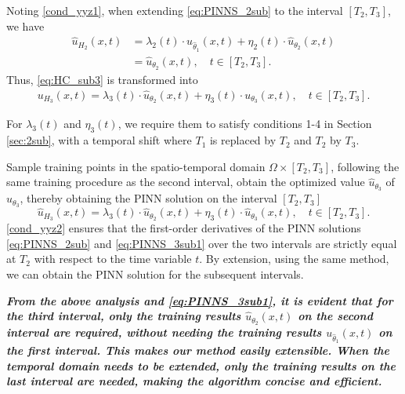 \documentclass[preprint]{elsarticle}
\numberwithin{table}{section}
\numberwithin{equation}{section}
\numberwithin{figure}{section}
\begin{document}
\begin{CJK}{UTF8}{gbsn}
 Noting \eqref{cond_yyz1}, when extending \eqref{eq:PINNS_2sub} to the interval $[T_2,T_3]$, we have 
\begin{equation}\label{eq:HC_T2}
\begin{aligned}
     \hat{u}_{H_2}(x,t) &= \lambda_2(t)\cdot u_{\hat\theta_1}(x,t) + \eta_2(t)\cdot \hat{u}_{\theta_2}(x,t)\\
     &= \hat{u}_{\theta_2}(x,t), \quad t\in[T_2,T_3].
     \end{aligned}
\end{equation}
 Thus, \eqref{eq:HC_sub3} is transformed into
\begin{equation}\label{eq:HC_sub31}
\begin{aligned}
    u_{H_3}(x,t) 
    = \lambda_3(t)\cdot  \hat{u}_{\theta_2}(x,t) + \eta_3(t)\cdot u_{\theta_3}(x,t), \quad t\in [T_2,T_3]. 
\end{aligned}  
\end{equation}

 

For $\lambda_3(t)$ and $\eta_3(t)$, we require them to satisfy conditions 1-4 in Section \ref{sec:2sub}, with a temporal shift where $T_1$
  is replaced by $T_2$
  and $T_2$
  by $T_3$. 
  
 

 
  
  Sample training points in the spatio-temporal domain $\Omega\times[T_2,T_3]$, following the same training procedure as the second interval, obtain the optimized value  
$\hat{u}_{\theta_3}$
  of $u_{\theta_3}$, thereby obtaining the PINN solution on the interval $[T_2,T_3]$
\begin{equation}\label{eq:PINNS_3sub1}
     \hat{u}_{H_3}(x,t) = \lambda_3(t)\cdot  \hat{u}_{\theta_2}(x,t) + \eta_3(t)\cdot \hat{u}_{\theta_3}(x,t),\quad t\in [T_2,T_3].
\end{equation}
\eqref{cond_yyz2} ensures that the first-order derivatives of the PINN solutions \eqref{eq:PINNS_2sub} and \eqref{eq:PINNS_3sub1} over the two intervals are strictly equal at $T_2$
  with respect to the time variable $t$. 
  By extension, using the same method, we can obtain the PINN solution for the subsequent intervals.
  
   
 
   

  
 \textbf{\textit{ From the above analysis and \eqref{eq:PINNS_3sub1}, it is evident that for the third interval, only the training results  
$ \hat{u}_{\theta_2}(x,t)$ on the second interval are required, without needing the training results  
$u_{\hat\theta_1}(x,t)$ on the first interval. This makes our method easily extensible. When the temporal domain  needs to be extended, only the training results on the last interval are needed, making the algorithm concise and efficient.}}




\end{CJK}
\end{document}
